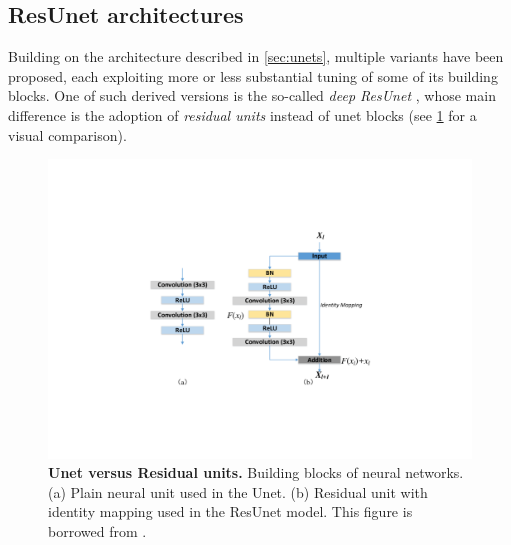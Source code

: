 \subsection{ResUnet architectures}
\label{sec:resunets}

Building on the architecture described in \cref{sec:unets}, multiple variants have been proposed, each exploiting more or less substantial tuning of some of its building blocks.
One of such derived versions is the so-called \textit{deep ResUnet} \cite{deep_resunet}, whose main difference is the adoption of \textit{residual units} \cite{residual_units} instead of unet blocks (see \cref{fig:residual_units}  for a visual comparison).
\begin{figure}
\centerline{
\includegraphics[width=\textwidth]{figures/130_methods/residual_unit.pdf}
}
\caption{\textbf{Unet versus Residual units.} Building blocks of neural networks. (a) Plain neural unit used in the Unet. (b) Residual unit with identity mapping used in the ResUnet model.
This figure is borrowed from \protect {}.
} \label{fig:residual_units}
\end{figure}


